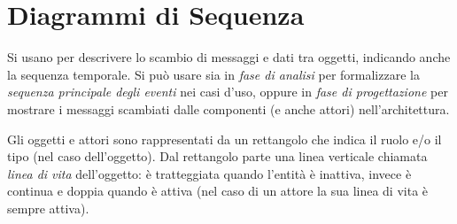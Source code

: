 \pagebreak
\section{Diagrammi di Sequenza}
Si usano per descrivere lo scambio di messaggi e dati tra oggetti, indicando
anche la sequenza temporale. Si può usare sia in \emph{fase di analisi} per formalizzare
la \emph{sequenza principale degli eventi} nei casi d'uso, oppure in \emph{fase di progettazione}
per mostrare i messaggi scambiati dalle componenti (e anche attori) nell'architettura.

Gli oggetti e attori sono rappresentati da un rettangolo che indica il ruolo
e/o il tipo (nel caso dell'oggetto). Dal rettangolo parte una linea verticale chiamata \emph{linea di vita}
dell'oggetto: è tratteggiata quando l'entità è inattiva, invece è continua e doppia quando è attiva (nel caso di un attore la sua linea di vita è sempre attiva).

